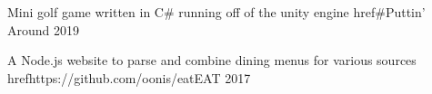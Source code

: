 
\begin{cventries}
\cventry
    {Mini golf game written in C# running off of the unity engine}
    {href{#}{Puttin' Around}} %
    {}
    {2019}
    {
    }
  
  \cventry
    {A Node.js website to parse and combine dining menus for various sources}
    {href{https://github.com/oonis/eat}{EAT}}
    {}
    {2017}
    {
    }

\end{cventries}
